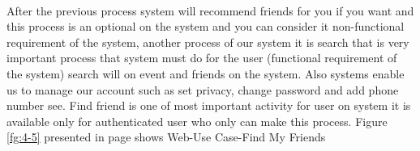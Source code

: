 \documentclass[12pt,a4paper,class,twoside,openany]{report}
\begin{document}
{\paragraph*{\hspace{.9 cm} } After the previous process system will recommend friends for you if you want and this process is an optional on the system and you can consider it non-functional requirement of the system, another process of our system it is search that is very important process that system must do for the user (functional requirement of the system) search will on event and friends on the system.
Also systems enable us to manage our account such as set privacy, change password and add phone number see. Find friend is one of most important activity for user on system it is available only for authenticated user who only can make this process.
Figure \ref{fg:4-5} presented in page \pageref{fg:4-5} shows Web-Use Case-Find My Friends
\begin{figure}
\begin{center}
\end{center}
\end{figure}}
\end{document}
